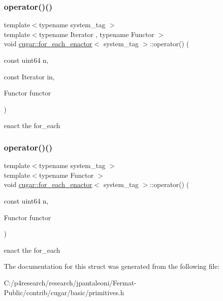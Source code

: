 \subsubsection{\texorpdfstring{operator()()}{operator()()}\hspace{0.1cm}{\footnotesize\ttfamily [1/2]}}
{\footnotesize\ttfamily template$<$typename system\+\_\+tag $>$ \\
template$<$typename Iterator , typename Functor $>$ \\
void \hyperlink{structcugar_1_1for__each__enactor}{cugar\+::for\+\_\+each\+\_\+enactor}$<$ system\+\_\+tag $>$\+::operator() (\begin{DoxyParamCaption}\item[{const uint64}]{n,  }\item[{const Iterator}]{in,  }\item[{Functor}]{functor }\end{DoxyParamCaption})\hspace{0.3cm}{\ttfamily [inline]}}

enact the for\+\_\+each \mbox{\label{structcugar_1_1for__each__enactor_a6b429ae818622e05dff95ec47dce9242}} 
\subsubsection{\texorpdfstring{operator()()}{operator()()}\hspace{0.1cm}{\footnotesize\ttfamily [2/2]}}
{\footnotesize\ttfamily template$<$typename system\+\_\+tag $>$ \\
template$<$typename Functor $>$ \\
void \hyperlink{structcugar_1_1for__each__enactor}{cugar\+::for\+\_\+each\+\_\+enactor}$<$ system\+\_\+tag $>$\+::operator() (\begin{DoxyParamCaption}\item[{const uint64}]{n,  }\item[{Functor}]{functor }\end{DoxyParamCaption})\hspace{0.3cm}{\ttfamily [inline]}}

enact the for\+\_\+each 

The documentation for this struct was generated from the following file\+:\begin{DoxyCompactItemize}
\item 
C\+:/p4research/research/jpantaleoni/\+Fermat-\/\+Public/contrib/cugar/basic/primitives.\+h\end{DoxyCompactItemize}
